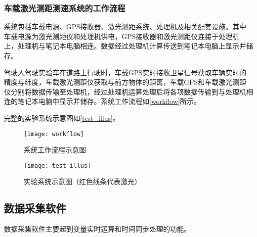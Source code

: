 \subsubsection{车载激光测距测速系统的工作流程}


系统包括车载电源、GPS接收器、激光测距系统、处理机及相关配套设施。其中车载电源为激光测距仪和处理机供电，GPS接收器和激光测距仪连接于处理机上，处理机与笔记本电脑相连。数据经过处理机计算传送到笔记本电脑上显示并储存。

驾驶人驾驶实验车在道路上行驶时，车载GPS实时接收卫星信号获取车辆实时的精度与纬度，车载激光测距仪获取与前方物体的距离，车载GPS和车载激光测距仪分别将数据传输至处理机，经过处理机运算处理后将各项数据传输到与处理机相连的笔记本电脑中显示并储存。系统工作流程如\autoref{workflow}所示。

完整的实验系统示意图如\autoref{test_illus}。

\begin{figure}[htpb]
	\centering
	\texttt{[image: workflow]}
	\caption{系统工作流程示意图}
	\label{workflow}
\end{figure}

\begin{figure}[htpb]
	\centering
	\texttt{[image: test\_illus]}
	\caption{实验系统示意图（红色线条代表激光）}
	\label{test_illus}
\end{figure}


\subsection{数据采集软件}

数据采集软件主要起到变量实时运算和时间同步处理的功能。

